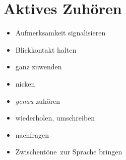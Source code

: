 \section{Aktives Zuhören}
\begin{itemize}
  \item Aufmerksamkeit signalisieren
  \item Blickkontakt halten
  \item ganz zuwenden
  \item nicken
  \item \emph{genau} zuhören
  \item wiederholen, umschreiben
  \item nachfragen
  \item \glqq Zwischentöne\grqq\ zur Sprache bringen
\end{itemize}